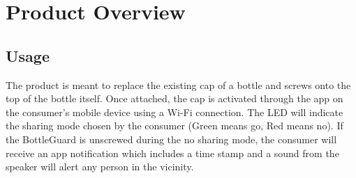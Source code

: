 \documentclass[12pt]{article}
\begin{document}
	\section*{Product Overview}
	\subsection*{Usage}
	The product is meant to replace the existing cap of a bottle and screws onto the top of the bottle itself. Once attached, the cap is activated through the app on the consumer’s mobile device using a Wi-Fi connection. The LED will indicate the sharing mode chosen by the consumer (Green means go, Red means no). If the BottleGuard is unscrewed during the no sharing mode, the consumer will receive an app notification which includes a time stamp and a sound from the speaker will alert any person in the vicinity.
	
\end{document}
